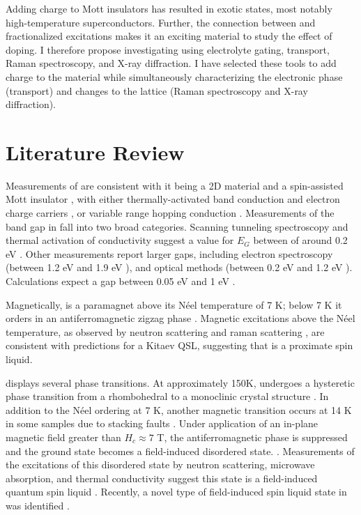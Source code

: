 \documentclass[11pt]{article}
\begin{document}
Adding charge to Mott insulators has resulted in exotic states, most notably high-temperature superconductors. Further, the connection between \rucl and fractionalized excitations makes it an exciting material to study the effect of doping. I therefore propose investigating \rucl using electrolyte gating, transport, Raman spectroscopy, and X-ray diffraction. I have selected these tools to add charge to the material while simultaneously characterizing the electronic phase (transport) and changes to the lattice (Raman spectroscopy and X-ray diffraction).

\section{Literature Review}
Measurements of \rucl are consistent with it being a 2D material \cite{Kim2015a} and a spin-assisted Mott insulator \cite{Plumb2014}, with either thermally-activated band conduction and electron charge carriers \cite{Rojas1983}, or variable range hopping conduction \cite{Mashhadi2018}. Measurements of the band gap in \rucl fall into two broad categories. Scanning tunneling spectroscopy and thermal activation of conductivity suggest a value for $E_{G}$ between of around 0.2 eV \cite{Binotto1971,Rojas1983,Ziatdinov2016}. Other measurements report larger gaps, including electron spectroscopy (between 1.2 eV and 1.9 eV \cite{Koitzsch2016,Zhou2016,Sinn2016}), and optical methods (between 0.2 eV and 1.2 eV \cite{Reschke2017,Pollini1996,Sandilands2016}). Calculations expect a gap between 0.05 eV and 1 eV  \cite{Sarikurt2017,Kim2015}.

Magnetically, \rucl is a paramagnet above its N{\'e}el temperature of 7 K; below 7 K it orders in an antiferromagnetic zigzag phase \cite{Sears2015}. Magnetic excitations above the N{\'e}el temperature, as observed by neutron scattering and raman scattering \cite{Banerjee2016,Sandilands2015}, are consistent with predictions for a Kitaev QSL, suggesting that \rucl is a proximate spin liquid.

\rucl displays several phase transitions. At approximately 150K, \rucl  undergoes a hysteretic phase transition from a rhombohedral to a monoclinic crystal structure \cite{Kubota2015,Ziatdinov2016,Glamazda2017,Reschke2017}. In addition to the N{\'e}el ordering at 7 K, another magnetic transition occurs at 14 K in some samples due to stacking faults \cite{Banerjee2016}. Under application of an in-plane magnetic field greater than $H_{c} \approx 7$ T, the antiferromagnetic phase is suppressed and the ground state becomes a field-induced disordered state. \cite{Hentrich2017,Wolter2017,Banerjee2017,Wang2017,Baek2017}. Measurements of the excitations of this disordered state by neutron scattering, microwave absorption, and thermal conductivity suggest this state is a field-induced quantum spin liquid \cite{Banerjee2016,Wellm2017,Kasahara2018}. Recently, a novel type of field-induced spin liquid state in \rucl was identified \cite{Lampen-Kelley2018}.
\end{document}
